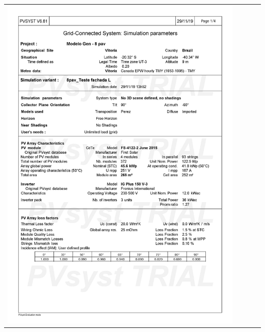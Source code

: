 \begin{table}[H]
    \centering
    \begin{tabular}{l}
        \includegraphics[width=0.9\textwidth]{figures/attachments/resultpv3.jpg}
    \end{tabular}
\end{table}
\pagebreak
